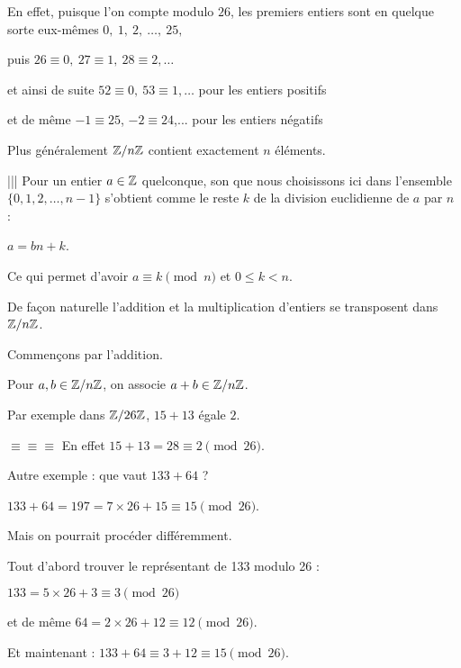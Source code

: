 En effet, puisque l'on compte modulo $26$, les premiers entiers sont en quelque sorte eux-mêmes
$0,\ 1,\ 2,\ \ldots,\  25,$

\change

 puis  $26\equiv 0,\  27 \equiv  1,\  28 \equiv  2,  \ldots$

\change
 
 et ainsi de suite $52\equiv 0,\  53\equiv 1, \ldots$ pour les entiers positifs

\change
 
et de même $-1\equiv 25$, $-2\equiv 24$,... pour les entiers négatifs

\change

Plus généralement $\mathbb{Z} / n \mathbb{Z}$ contient exactement $n$ éléments.

\change

||| Pour un entier $a \in \mathbb{Z}$ quelconque, son 
que nous choisissons ici dans l'ensemble $\{0,1,2,\ldots, n-1\}$ s'obtient comme le reste $k$
de la division euclidienne de $a$ par $n$ :


$a = bn + k$.

\change

Ce qui permet d'avoir $a \equiv  k \pmod n$ et $0 \le k < n$.


\diapo

De façon naturelle l'addition et la multiplication d'entiers se transposent dans $\mathbb{Z}/n\mathbb{Z}$.

Commençons par l'addition.

\change

Pour $a,b \in \mathbb{Z}/n\mathbb{Z}$, on associe $a+b \in \mathbb{Z}/n\mathbb{Z}$.

\change
Par exemple dans $\mathbb{Z}/26\mathbb{Z}$, $15+13$ égale $2$.

\change
$\equiv \equiv \equiv$ En effet $15+13 = 28 \equiv 2 \pmod{26}$.

\change
Autre exemple : que vaut $133+64$ ?

\change
$133+64=197=7\times 26 +15 \equiv 15 \pmod {26}$.

\change
Mais on pourrait procéder différemment.

Tout d'abord trouver le représentant de 133 modulo 26 :

$133 = 5 \times 26 + 3 \equiv 3 \pmod {26}$

\change
et de même $64 = 2 \times 26 + 12 \equiv 12 \pmod{26}$.

\change
Et maintenant :
$133 + 64 \equiv 3 + 12 \equiv 15 \pmod{26}$.


